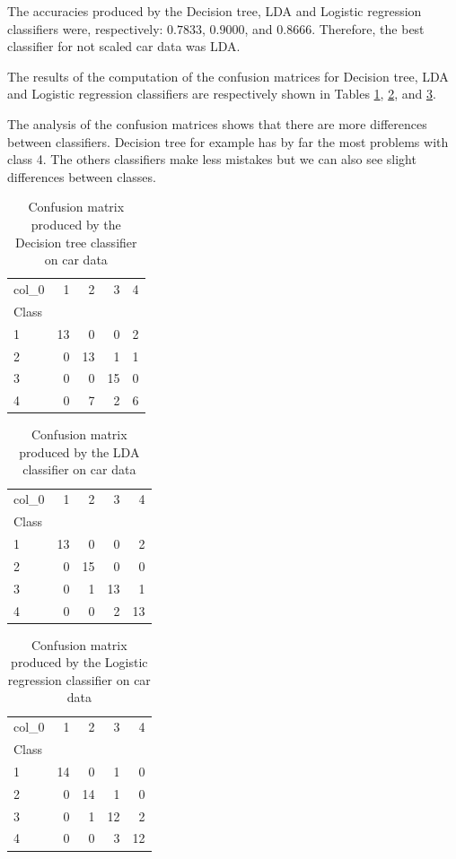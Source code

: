 \documentclass{article} %
\begin{document}
The accuracies produced by the Decision tree, LDA and Logistic regression classifiers were, respectively: $0.7833$, $0.9000$, and $0.8666$. Therefore, the best classifier for not scaled car data was LDA.

The results of the computation of the confusion matrices for Decision tree, LDA and Logistic regression classifiers are respectively shown in Tables \ref{tab:CM_CAR_DT}, \ref{tab:CM_CAR_LDA}, and \ref{tab:CM_CAR_LR}.

The analysis of the confusion matrices shows that there are more differences between classifiers. Decision tree for example has by far the most problems with class 4. The others classifiers make less mistakes but we can also see slight differences between classes.

\begin{table}
\centering
\begin{tabular}{lrrrr}
\toprule
col\_0 &   1 &   2 &   3 &  4 \\
Class &     &     &     &    \\
\midrule
1     &  13 &   0 &   0 &  2 \\
2     &   0 &  13 &   1 &  1 \\
3     &   0 &   0 &  15 &  0 \\
4     &   0 &   7 &   2 &  6 \\
\bottomrule
\end{tabular}
\caption{Confusion matrix produced by the Decision tree classifier on car data}
\label{tab:CM_CAR_DT}
\end{table}

\begin{table}
\centering
\begin{tabular}{lrrrr}
\toprule
col\_0 &   1 &   2 &   3 &   4 \\
Class &     &     &     &     \\
\midrule
1     &  13 &   0 &   0 &   2 \\
2     &   0 &  15 &   0 &   0 \\
3     &   0 &   1 &  13 &   1 \\
4     &   0 &   0 &   2 &  13 \\
\bottomrule
\end{tabular}
\caption{Confusion matrix produced by the LDA classifier on car data}
\label{tab:CM_CAR_LDA}
\end{table}

\begin{table}
\centering
\begin{tabular}{lrrrr}
\toprule
col\_0 &   1 &   2 &   3 &   4 \\
Class &     &     &     &     \\
\midrule
1     &  14 &   0 &   1 &   0 \\
2     &   0 &  14 &   1 &   0 \\
3     &   0 &   1 &  12 &   2 \\
4     &   0 &   0 &   3 &  12 \\
\bottomrule
\end{tabular}
\caption{Confusion matrix produced by the Logistic regression classifier on car data}
\label{tab:CM_CAR_LR}
\end{table}
\end{document}
